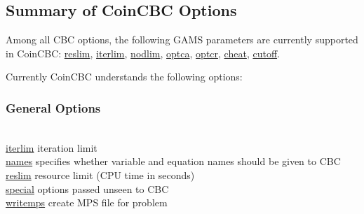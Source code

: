 \subsection{Summary of CoinCBC Options}

Among all CBC options, the following GAMS parameters are currently supported in CoinCBC:
\hyperlink{reslim}{reslim}, \hyperlink{iterlim}{iterlim}, \hyperlink{nodlim}{nodlim}, \hyperlink{optca}{optca}, \hyperlink{optcr}{optcr}, \hyperlink{increment}{cheat}, \hyperlink{cutoff}{cutoff}.

Currently CoinCBC understands the following options:

\subsubsection{General Options}
\begin{tabbing}
\hspace {1.3in} \= \\
\hyperlink{iterlim}
{iterlim} \> iteration limit \\
\hyperlink{names}
{names} \> specifies whether variable and equation names should be given to CBC \\
\hyperlink{reslim}
{reslim} \> resource limit (CPU time in seconds)\\
\hyperlink{special}
{special} \> options passed unseen to CBC \\
\hyperlink{writemps}
{writemps} \> create MPS file for problem
\end{tabbing}

